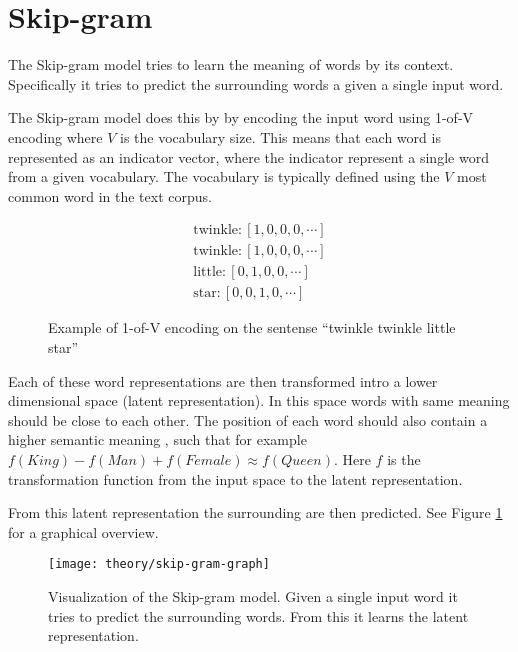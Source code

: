 
\section{Skip-gram}

The Skip-gram model tries to learn the meaning of words by its context. Specifically it tries to predict the surrounding words a given a single input word.

The Skip-gram model does this by by encoding the input word using 1-of-V encoding where $V$ is the vocabulary size. This means that each word is represented as an indicator vector, where the indicator represent a single word from a given vocabulary. The vocabulary is typically defined using the $V$ most common word in the text corpus.
\begin{figure}[H]
\begin{equation*}
\begin{aligned}
\text{twinkle}: \left[1, 0, 0, 0, \cdots \right] \\
\text{twinkle}: \left[1, 0, 0, 0, \cdots \right] \\
\text{little}: \left[0, 1, 0, 0, \cdots \right] \\
\text{star}: \left[0, 0, 1, 0, \cdots \right]
\end{aligned}
\end{equation*}
\caption{Example of 1-of-V encoding on the sentense ``twinkle twinkle little star''}
\end{figure}

Each of these word representations are then transformed intro a lower dimensional space (latent representation). In this space words with same meaning should be close to each other. The position of each word should also contain a higher semantic meaning , such that for example $f(King) - f(Man) + f(Female) \approx f(Queen)$. Here $f$ is the transformation function from the input space to the latent representation.

From this latent representation the surrounding are then predicted. See Figure \ref{fig:theory:skip-gram:graph} for a graphical overview.

\begin{figure}[h]
	\centering
	\texttt{[image: theory/skip-gram-graph]}
	\caption{Visualization of the Skip-gram model. Given a single input word it tries to predict the surrounding words. From this it learns the latent representation.}
	\label{fig:theory:skip-gram:graph}
\end{figure}

